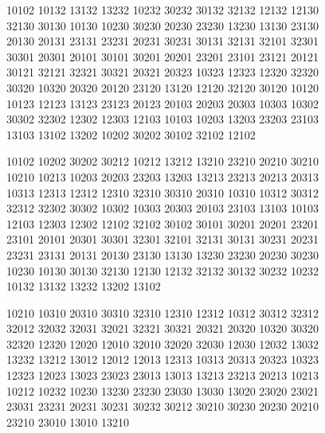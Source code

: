 \begingroup\footnotesize\ttfamily\begin{flushleft}
10102 10132 13132 13232 10232 30232 30132 32132 12132 12130\\
32130 30130 10130 10230 30230 20230 23230 13230 13130 23130\\
20130 20131 23131 23231 20231 30231 30131 32131 32101 32301\\
30301 20301 20101 30101 30201 20201 23201 23101 23121 20121\\
30121 32121 32321 30321 20321 20323 10323 12323 12320 32320\\
30320 10320 20320 20120 23120 13120 12120 32120 30120 10120\\
10123 12123 13123 23123 20123 20103 20203 20303 10303 10302\\
30302 32302 12302 12303 12103 10103 10203 13203 23203 23103\\
13103 13102 13202 10202 30202 30102 32102 12102\\
\end{flushleft}\endgroup
\begingroup\footnotesize\ttfamily\begin{flushleft}
10102 10202 30202 30212 10212 13212 13210 23210 20210 30210\\
10210 10213 10203 20203 23203 13203 13213 23213 20213 20313\\
10313 12313 12312 12310 32310 30310 20310 10310 10312 30312\\
32312 32302 30302 10302 10303 20303 20103 23103 13103 10103\\
12103 12303 12302 12102 32102 30102 30101 30201 20201 23201\\
23101 20101 20301 30301 32301 32101 32131 30131 30231 20231\\
23231 23131 20131 20130 23130 13130 13230 23230 20230 30230\\
10230 10130 30130 32130 12130 12132 32132 30132 30232 10232\\
10132 13132 13232 13202 13102\\
\end{flushleft}\endgroup
\begingroup\footnotesize\ttfamily\begin{flushleft}
10210 10310 20310 30310 32310 12310 12312 10312 30312 32312\\
32012 32032 32031 32021 32321 30321 20321 20320 10320 30320\\
32320 12320 12020 12010 32010 32020 32030 12030 12032 13032\\
13232 13212 13012 12012 12013 12313 10313 20313 20323 10323\\
12323 12023 13023 23023 23013 13013 13213 23213 20213 10213\\
10212 10232 10230 13230 23230 23030 13030 13020 23020 23021\\
23031 23231 20231 30231 30232 30212 30210 30230 20230 20210\\
23210 23010 13010 13210\\
\end{flushleft}\endgroup
